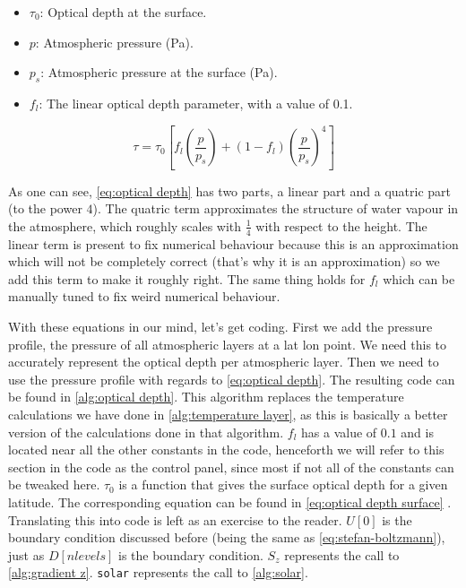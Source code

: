 \begin{itemize}
    \item $\tau_0$: Optical depth at the surface.
    \item $p$: Atmospheric pressure (\si{Pa}).
    \item $p_s$: Atmospheric pressure at the surface (\si{Pa}).
    \item $f_l$: The linear optical depth parameter, with a value of 0.1.
\end{itemize}

\begin{equation}
    \tau = \tau_0[f_l(\frac{p}{p_s}) + (1 - f_l)(\frac{p}{p_s})^4]
    \label{eq:optical depth}
\end{equation}

As one can see, \autoref{eq:optical depth} has two parts, a linear part and a quatric part (to the power $4$). The quatric term approximates the structure of water vapour in the atmosphere, which 
roughly scales with $\frac{1}{4}$ with respect to the height. The linear term is present to fix numerical behaviour because this is an approximation which will not be completely correct (that's
why it is an approximation) so we add this term to make it roughly right. The same thing holds for $f_l$ which can be manually tuned to fix weird numerical behaviour.

With these equations in our mind, let's get coding. First we add the pressure profile, the pressure of all atmospheric layers at a lat lon point. We need this to accurately represent the optical 
depth per atmospheric layer. Then we need to use the pressure profile with regards to \autoref{eq:optical depth}. The resulting code can be found in \autoref{alg:optical depth}. This algorithm 
replaces the temperature calculations we have done in \autoref{alg:temperature layer}, as this is basically a better version of the calculations done in that algorithm. $f_l$ has a value of $0.1$
and is located near all the other constants in the code, henceforth we will refer to this section in the code as the control panel, since most if not all of the constants can be tweaked here. 
$\tau_0$ is a function that gives the surface optical depth for a given latitude. The corresponding equation can be found in \autoref{eq:optical depth surface} \cite{simon}. Translating this 
into code is left as an exercise to the reader. $U[0]$ is the boundary condition discussed before (being the same as \autoref{eq:stefan-boltzmann}), just as $D[nlevels]$ is the boundary condition. 
$S_z$ represents the call to \autoref{alg:gradient z}. \texttt{solar} represents the call to \autoref{alg:solar}.

